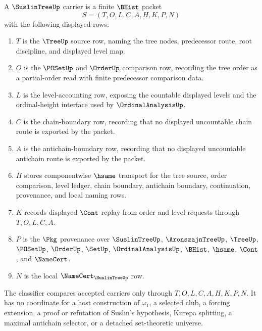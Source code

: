 \begin{definition}
\label{def:suslin-tree-carrier}
A $\SuslinTreeUp$ carrier is a finite $\BHist$ packet
$$
S=(T,O,L,C,A,H,K,P,N)
$$
with the following displayed rows:
\begin{enumerate}
\item $T$ is the $\TreeUp$ source row, naming the tree nodes, predecessor route, root discipline, and displayed level map.
\item $O$ is the $\POSetUp$ and $\OrderUp$ comparison row, recording the tree order as a partial-order read with finite predecessor comparison data.
\item $L$ is the level-accounting row, exposing the countable displayed levels and the ordinal-height interface used by $\OrdinalAnalysisUp$.
\item $C$ is the chain-boundary row, recording that no displayed uncountable chain route is exported by the packet.
\item $A$ is the antichain-boundary row, recording that no displayed uncountable antichain route is exported by the packet.
\item $H$ stores componentwise $\hsame$ transport for the tree source, order comparison, level ledger, chain boundary, antichain boundary, continuation, provenance, and local naming rows.
\item $K$ records displayed $\Cont$ replay from order and level requests through $T,O,L,C,A$.
\item $P$ is the $\Pkg$ provenance over $\SuslinTreeUp$, $\AronszajnTreeUp$, $\TreeUp$, $\POSetUp$, $\OrderUp$, $\SetUp$, $\OrdinalAnalysisUp$, $\BHist$, $\hsame$, $\Cont$, and $\NameCert$.
\item $N$ is the local $\NameCert_{\SuslinTreeUp}$ row.
\end{enumerate}
The classifier compares accepted carriers only through $T,O,L,C,A,H,K,P,N$. It has no coordinate for a host construction of $\omega_1$, a selected club, a forcing extension, a proof or refutation of Suslin's hypothesis, Kurepa splitting, a maximal antichain selector, or a detached set-theoretic universe.
\end{definition}

